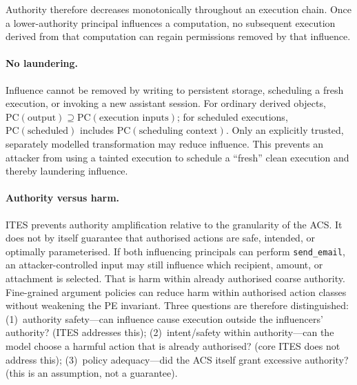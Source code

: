 \documentclass{article}
\begin{document}
Authority therefore decreases monotonically throughout an execution chain. Once
a lower-authority principal influences a computation, no subsequent execution
derived from that computation can regain permissions removed by that influence.

\paragraph{No laundering.}
Influence cannot be removed by writing to persistent storage, scheduling a
fresh execution, or invoking a new assistant session. For ordinary derived
objects, $\mathrm{PC}(\text{output}) \supseteq \mathrm{PC}(\text{execution
inputs})$; for scheduled executions, $\mathrm{PC}(\text{scheduled})$ includes
$\mathrm{PC}(\text{scheduling context})$. Only an explicitly trusted, separately
modelled transformation may reduce influence. This prevents an attacker from
using a tainted execution to schedule a ``fresh'' clean execution and thereby
laundering influence.

\paragraph{Authority versus harm.}
ITES prevents authority amplification relative to the granularity of the ACS.
It does not by itself guarantee that authorised actions are safe, intended, or
optimally parameterised. If both influencing principals can perform
\texttt{send\_email}, an attacker-controlled input may still influence which
recipient, amount, or attachment is selected. That is harm within already
authorised coarse authority. Fine-grained argument policies can reduce harm
within authorised action classes without weakening the PE invariant. Three
questions are therefore distinguished: (1)~authority safety---can influence
cause execution outside the influencers' authority? (ITES addresses this);
(2)~intent/safety within authority---can the model choose a harmful action
that is already authorised? (core ITES does not address this);
(3)~policy adequacy---did the ACS itself grant excessive authority? (this is
an assumption, not a guarantee).
\end{document}
